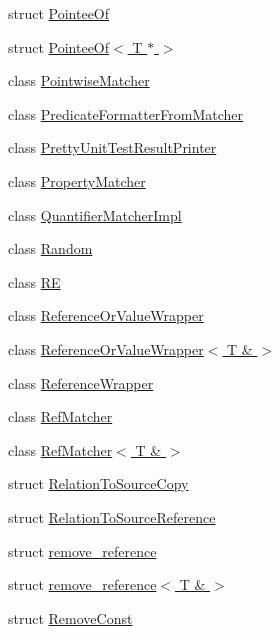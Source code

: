 \begin{DoxyCompactItemize}
struct \hyperlink{structtesting_1_1internal_1_1PointeeOf}{Pointee\+Of}
\item 
struct \hyperlink{structtesting_1_1internal_1_1PointeeOf_3_01T_01_5_01_4}{Pointee\+Of$<$ T $\ast$ $>$}
\item 
class \hyperlink{classtesting_1_1internal_1_1PointwiseMatcher}{Pointwise\+Matcher}
\item 
class \hyperlink{classtesting_1_1internal_1_1PredicateFormatterFromMatcher}{Predicate\+Formatter\+From\+Matcher}
\item 
class \hyperlink{classtesting_1_1internal_1_1PrettyUnitTestResultPrinter}{Pretty\+Unit\+Test\+Result\+Printer}
\item 
class \hyperlink{classtesting_1_1internal_1_1PropertyMatcher}{Property\+Matcher}
\item 
class \hyperlink{classtesting_1_1internal_1_1QuantifierMatcherImpl}{Quantifier\+Matcher\+Impl}
\item 
class \hyperlink{classtesting_1_1internal_1_1Random}{Random}
\item 
class \hyperlink{classtesting_1_1internal_1_1RE}{RE}
\item 
class \hyperlink{classtesting_1_1internal_1_1ReferenceOrValueWrapper}{Reference\+Or\+Value\+Wrapper}
\item 
class \hyperlink{classtesting_1_1internal_1_1ReferenceOrValueWrapper_3_01T_01_6_01_4}{Reference\+Or\+Value\+Wrapper$<$ T \& $>$}
\item 
class \hyperlink{classtesting_1_1internal_1_1ReferenceWrapper}{Reference\+Wrapper}
\item 
class \hyperlink{classtesting_1_1internal_1_1RefMatcher}{Ref\+Matcher}
\item 
class \hyperlink{classtesting_1_1internal_1_1RefMatcher_3_01T_01_6_01_4}{Ref\+Matcher$<$ T \& $>$}
\item 
struct \hyperlink{structtesting_1_1internal_1_1RelationToSourceCopy}{Relation\+To\+Source\+Copy}
\item 
struct \hyperlink{structtesting_1_1internal_1_1RelationToSourceReference}{Relation\+To\+Source\+Reference}
\item 
struct \hyperlink{structtesting_1_1internal_1_1remove__reference}{remove\+\_\+reference}
\item 
struct \hyperlink{structtesting_1_1internal_1_1remove__reference_3_01T_01_6_01_4}{remove\+\_\+reference$<$ T \& $>$}
\item 
struct \hyperlink{structtesting_1_1internal_1_1RemoveConst}{Remove\+Const}
\item 

\end{DoxyCompactItemize}
